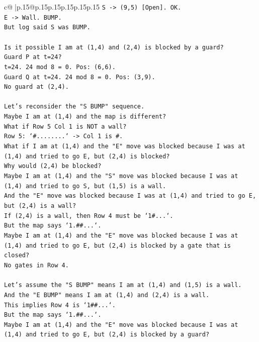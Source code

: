 \documentclass{article}
\begin{document}
{\begin{supertabular}{c@{$\;$}|p{.15\linewidth}@{}p{.15\linewidth}p{.15\linewidth}p{.15\linewidth}p{.15\linewidth}p{.15\linewidth}}
{{{\texttt{S {-}> (9,5) {[}Open{]}. OK.} \\
\texttt{E {-}> Wall. BUMP.} \\
\texttt{But log said S was BUMP.} \\
\\ 
\texttt{Is it possible I am at (1,4) and (2,4) is blocked by a guard?} \\
\texttt{Guard P at t=24?} \\
\texttt{t=24. 24 mod 8 = 0. Pos: (6,6).} \\
\texttt{Guard Q at t=24. 24 mod 8 = 0. Pos: (3,9).} \\
\texttt{No guard at (2,4).} \\
\\ 
\texttt{Let's reconsider the "S BUMP" sequence.} \\
\texttt{Maybe I am at (1,4) and the map is different?} \\
\texttt{What if Row 5 Col 1 is NOT a wall?} \\
\texttt{Row 5: `\#........` {-}> Col 1 is \#.} \\
\texttt{What if I am at (1,4) and the "E" move was blocked because I was at (1,4) and tried to go E, but (2,4) is blocked?} \\
\texttt{Why would (2,4) be blocked?} \\
\texttt{Maybe I am at (1,4) and the "S" move was blocked because I was at (1,4) and tried to go S, but (1,5) is a wall.} \\
\texttt{And the "E" move was blocked because I was at (1,4) and tried to go E, but (2,4) is a wall?} \\
\texttt{If (2,4) is a wall, then Row 4 must be `1\#...`.} \\
\texttt{But the map says `1.\#\#...`.} \\
\texttt{Maybe I am at (1,4) and the "E" move was blocked because I was at (1,4) and tried to go E, but (2,4) is blocked by a gate that is closed?} \\
\texttt{No gates in Row 4.} \\
\\ 
\texttt{Let's assume the "S BUMP" means I am at (1,4) and (1,5) is a wall.} \\
\texttt{And the "E BUMP" means I am at (1,4) and (2,4) is a wall.} \\
\texttt{This implies Row 4 is `1\#\#...`.} \\
\texttt{But the map says `1.\#\#...`.} \\
\texttt{Maybe I am at (1,4) and the "E" move was blocked because I was at (1,4) and tried to go E, but (2,4) is blocked by a guard?} \\
}}}
\end{supertabular}}
\end{document}
